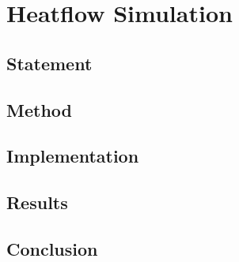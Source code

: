 \section{Heatflow Simulation}

\subsection{Statement}
\subsection{Method}
\subsection{Implementation}
\subsection{Results}
\subsection{Conclusion}
